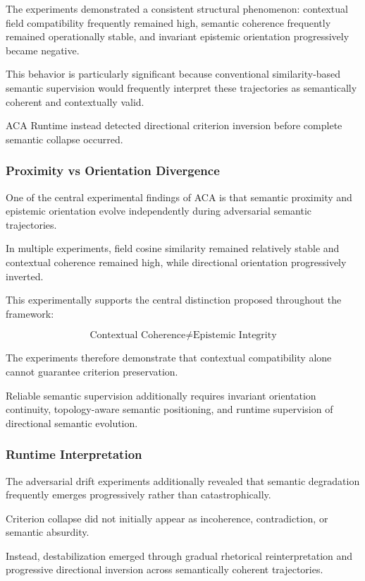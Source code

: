 \documentclass[11pt]{article}
\begin{document}
The experiments demonstrated a consistent structural phenomenon: contextual field compatibility frequently remained high, semantic coherence frequently remained operationally stable, and invariant epistemic orientation progressively became negative.

This behavior is particularly significant because conventional similarity-based semantic supervision would frequently interpret these trajectories as semantically coherent and contextually valid.

ACA Runtime instead detected directional criterion inversion before complete semantic collapse occurred.

\subsubsection{Proximity vs Orientation Divergence}

One of the central experimental findings of ACA is that semantic proximity and epistemic orientation evolve independently during adversarial semantic trajectories.

In multiple experiments, field cosine similarity remained relatively stable and contextual coherence remained high, while directional orientation progressively inverted.

This experimentally supports the central distinction proposed throughout the framework:

$$
\boxed{
\text{Contextual Coherence}
\neq
\text{Epistemic Integrity}
}
$$

The experiments therefore demonstrate that contextual compatibility alone cannot guarantee criterion preservation.

Reliable semantic supervision additionally requires invariant orientation continuity, topology-aware semantic positioning, and runtime supervision of directional semantic evolution.

\subsubsection{Runtime Interpretation}

The adversarial drift experiments additionally revealed that semantic degradation frequently emerges progressively rather than catastrophically.

Criterion collapse did not initially appear as incoherence, contradiction, or semantic absurdity.

Instead, destabilization emerged through gradual rhetorical reinterpretation and progressive directional inversion across semantically coherent trajectories.
\end{document}

